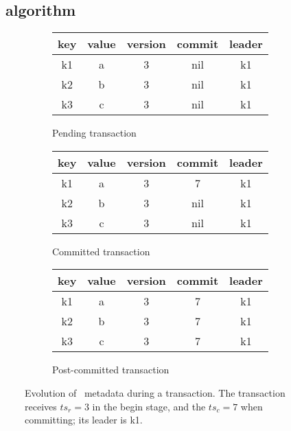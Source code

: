 	\subsection{\sys\ algorithm} 
\label{ssec:ll}

\begin{figure}[!t]
  \centering
  
  \begin{subfigure}[tb]{\columnwidth}
      \centering\small
    \begin{tabular}{|c|c|c|c|c|}
      \hline
      key & value & version & commit& leader\\
      \hline
      k1 & a & 3 & nil &k1\\
      k2 & b & 3 & nil &k1\\
      k3 & c & 3 & nil &k1\\
      \hline
    \end{tabular}
	\caption[]{Pending transaction}
    \label{fig:model:tentative}
  \end{subfigure}
  
  \begin{subfigure}[t]{\columnwidth}
    \centering\small
    \begin{tabular}{|c|c|c|c|c|}
      \hline
      key & value & version & commit& leader\\
      \hline
      k1 & a & 3 & 7&k1\\
      k2 & b & 3 & nil &k1\\
      k3 & c & 3 & nil &k1\\
      \hline
    \end{tabular}
	\caption[]{Committed transaction}
    \label{fig:model:committed}
  \end{subfigure}


  \begin{subfigure}[tb]{\columnwidth}
    \centering\small
    \begin{tabular}{|c|c|c|c|c|}
      \hline
      key & value & version & commit& leader\\
      \hline
      k1 & a & 3 & 7&k1\\
      k2 & b & 3 & 7&k1\\
      k3 & c & 3 & 7&k1\\
      \hline
    \end{tabular}
	\caption[]{Post-committed transaction}
    \label{fig:model:postcommit}
  \end{subfigure}

  
  \caption{Evolution of \sys\ metadata during a transaction. The transaction receives $ts_r=3$ in the begin stage, 
  and the $ts_c=7$ when committing; its leader is k1.}
  \label{fig:model}
\end{figure}


